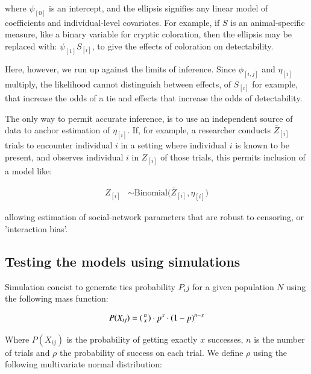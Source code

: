 \documentclass[Afour,sageh,times]{sagej}
\begin{document}
where $\psi_{[0]}$ is an intercept, and the ellipsis signifies any linear model of coefficients and individual-level covariates. For example, if $S$ is an animal-specific measure, like a binary variable for cryptic coloration, then the ellipsis  may be replaced with:  $\psi_{[1]}S_{[i]}$, to give the effects of coloration on detectability.

Here, however, we run up against the limits of inference. Since $\phi_{[i,j]}$ and $\eta_{[i]}$ multiply, the likelihood cannot distinguish between effects, of $S_{[i]}$ for example, that increase the odds of a tie and effects that increase the odds of detectability.

The only way to permit accurate inference, is to use an independent source of data to anchor estimation of $\eta_{[i]}$. If, for example, a researcher conducts $\bar Z_{[i]}$ trials to encounter individual $i$ in a setting where individual $i$ is known to be present, and observes individual $i$ in $Z_{[i]}$ of those trials, this permits inclusion of a model like:
\begin{ceqn}
\begin{align}\label{maineq2}
 Z_{[i]} &\sim \mathrm{Binomial}\Big(\bar Z_{[i]}, \eta_{[i]} \Big)
\end{align}
\end{ceqn}
allowing estimation of social-network parameters that are robust to censoring, or 'interaction bias'.

\subsection{Testing the models using simulations}

Simulation concist to generate ties probability $P_ij$ for a given population $N$ using the following mass function:

\begin{ceqn}
  \begin{align}\label{mass}
    P(X_{ij}) = 
    \begin{psmallmatrix}
      n\\
      x
    \end{psmallmatrix}\cdot   p^{x} \cdot (1-p)^{n-x}  
  \end{align}    
\end{ceqn}
Where $P(X_{ij})$ is the probability of getting exactly $x$ successes, $n$ is the number of trials and $\rho$ the probability of success on each trial. We define $\rho$ using the following multivariate normal distribution:
\end{document}
